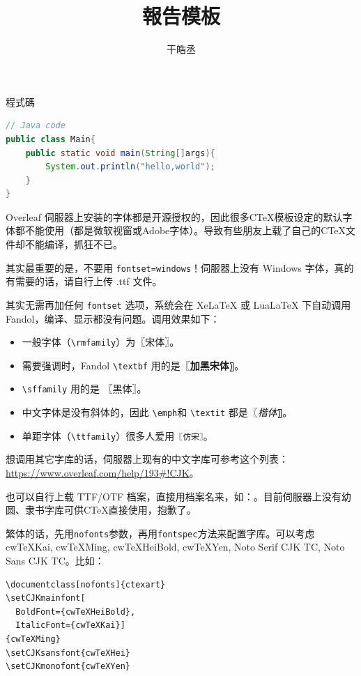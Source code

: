 \documentclass[11pt]{ctexart}
\title{報告模板}
\author{干皓丞}
\begin{document}
\maketitle

程式碼
	\begin{lstlisting}[language={java}]
// Java code
public class Main{
	public static void main(String[]args){
		System.out.println("hello,world");
	}
}
	\end{lstlisting}


Overleaf 伺服器上安装的字体都是开源授权的，因此很多C\TeX{}模板设定的默认字体都不能使用（都是微软视窗或Adobe字体）。导致有些朋友上载了自己的C\TeX{}文件却不能编译，抓狂不已。

其实最重要的是，不要用 \verb|fontset=windows|！伺服器上没有 Windows 字体，真的有需要的话，请自行上传 .ttf 文件。

其实无需再加任何 \verb|fontset| 选项，系统会在 XeLaTeX 或 LuaLaTeX 下自动调用 Fandol，编译、显示都没有问题。调用效果如下：

\begin{itemize}
\item 一般字体（\verb|\rmfamily|）为〖宋体〗。
\item 需要强调时，Fandol \verb|\textbf| 用的是〖\textbf{加黑宋体}〗。
\item \verb|\sffamily| 用的是 〖\textsf{黑体}〗。
\item 中文字体是没有斜体的，因此 \verb|\emph|和 \verb|\textit| 都是〖\textit{楷体}〗。

\item 单距字体（\verb|\ttfamily|）很多人爱用\texttt{〖仿宋〗}。

\end{itemize}


想调用其它字库的话，伺服器上现有的中文字库可参考这个列表：\url{https://www.overleaf.com/help/193#!CJK}。

也可以自行上载 TTF/OTF 档案，直接用档案名来，如：\texttt{\setmainfont{shuti.otf}}。目前伺服器上没有幼圆、隶书字库可供C\TeX{}直接使用，抱歉了。


繁体的话，先用\verb|nofonts|参数，再用\verb|fontspec|方法来配置字库。可以考虑 cwTeXKai, cwTeXMing, cwTeXHeiBold, cwTeXYen, Noto Serif CJK TC, Noto Sans CJK TC。比如：

\begin{verbatim}
\documentclass[nofonts]{ctexart}
\setCJKmainfont[
  BoldFont={cwTeXHeiBold},
  ItalicFont={cwTeXKai}]
{cwTeXMing}
\setCJKsansfont{cwTeXHei}
\setCJKmonofont{cwTeXYen}
\end{verbatim}
\end{document}
